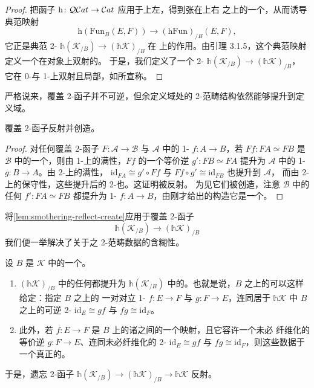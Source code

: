 \begin{proof}
把\trHomotopyCategory{}函子 $\mathrm{h}\colon\mathcal{Q}\mathcal{C}at\to\mathcal{C}at$ 应用于上左\trPullback，得到张在上右%
\trPullback{}之上的一个\trCone，从而诱导典范映射
\[
\mathrm{h}(\mathrm{Fun}_{B}(E,F))\longrightarrow(\mathrm{hFun})_{/B}(E,F),
\]
它正是典范 2-\trTwoFunctor{} $\mathbb{h}(\mathcal{K}_{/B})\to(\mathbb{h}\mathcal{K})_{/B}$ 在 %
\trHomCategory{}上的作用。由引理 3.1.5，这个典范映射定义一个在对象上双射的\trSmotheringFunctor。%
于是，我们定义了一个 2-\trTwoFunctor{} $\mathbb{h}(\mathcal{K}_{/B})\to(\mathbb{h}\mathcal{K})_{/B}$，%
它在 0-与 1-\trCell{}上双射且局部\trSmothering，如所宣称。
\end{proof}

严格说来，覆盖 2-函子并不可逆，但余定义域处的 2-范畴结构依然能够提升到定义域。

\begin{lemma}\label{lem:smothering-reflect-create}
覆盖 2-函子反射并创造\trEquivalence。
\end{lemma}

\begin{proof}
对任何覆盖 2-函子 $F\colon\mathcal{A}\to\mathcal{B}$ 与 $\mathcal{A}$ 中的 1-\trCell{} %
$f\colon A\to B$，若 $Ff\colon FA\simeq FB$ 是 $\mathcal{B}$ 中的一个\trEquivalence，则由 %
1-\trCell{}上的满性，$Ff$ 的一个等价逆 $g'\colon FB\simeq FA$ 提升为 $\mathcal{A}$ 中的 %
1-\trCell{} $g\colon B\to A$。由 2-\trCell{}上的满性，\trIsomorphism{} %
$\mathrm{id}_{FA}\cong g'\circ Ff$ 与 $Ff\circ g'\cong\mathrm{id}_{FB}$ 也提升到 $\mathcal{A}$，%
而由 2-\trCell{}上的保守性，这些提升后的 2-\trCell{}也\trInvertible。这证明\trEquivalence{}被反射。%
为见它们被创造，注意 $\mathcal{B}$ 中的任何 $f'\colon FA\simeq FB$ 都提升为 1-\trCell{} %
$f\colon A\to B$，由刚才给出的构造它是一个\trEquivalence。
\end{proof}

将\cref{lem:smothering-reflect-create}应用于覆盖 2-函子
\[
\mathbb{h}(\mathcal{K}_{/B})\longrightarrow(\mathbb{h}\mathcal{K})_{/B}
\]
我们便一举解决了关于\trFiberedEquivalence{}之 2-范畴数据的含糊性。

\begin{proposition}[纤维化等价数据]\label{prop:fibered-equivalence-data}
设 $B$ 是\trInfinityCosmos{} $\mathcal{K}$ 中的一个\trInfinityCategory。
\begin{enumerate}[label=(\roman*)]
\item $(\mathbb{h}\mathcal{K})_{/B}$ 中的任何\trEquivalence{}都提升为 $\mathbb{h}(\mathcal{K}_{/B})$ %
中的\trEquivalence。也就是说，$B$ 之上的\trFiberedEquivalence{}可以这样给定：指定 $B$ 之上的%
一对对立 1-\trCell{} $f\colon E\to F$ 与 $g\colon F\to E$，连同居于 $\mathbb{h}\mathcal{K}$ 中 %
$B$ 之上的可逆 2-\trCell{} $\mathrm{id}_{E}\cong gf$ 与 $fg\cong\mathrm{id}_{F}$。
\item 此外，若 $f\colon E\to F$ 是 $B$ 上的诸\trIsofibration{}之间的一个映射，且它容许一个未必 %
纤维化的等价逆 $g\colon F\to E$、连同未必纤维化的 2-\trCell{} $\mathrm{id}_{E}\cong gf$ 与 %
$fg\cong\mathrm{id}_{F}$，则这些数据\trIsomorphism{}于一个真正的\trFiberedEquivalence。
\end{enumerate}
于是，遗忘 2-函子 $\mathbb{h}(\mathcal{K}_{/B})\to(\mathbb{h}\mathcal{K})_{/B}\to\mathbb{h}\mathcal{K}$ %
反射\trEquivalence。
\end{proposition}

